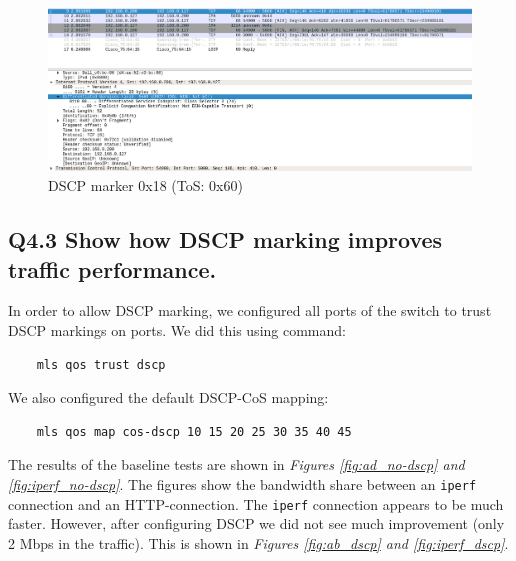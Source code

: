 \documentclass{article}
\begin{document}
\begin{figure}[H]
\centering
\includegraphics[width=17cm]{figures/dscp_marker.png}
\caption{DSCP marker 0x18 (ToS: 0x60)}
\centering
\label{fig:dscp_marker}
\end{figure}

\subsection{Q4.3 Show how DSCP marking improves traffic performance.}
In order to allow DSCP marking, we configured all ports of the switch to trust DSCP markings on ports. We did this using command:
\begin{verbatim}
    mls qos trust dscp
\end{verbatim}

We also configured the default DSCP-CoS mapping:
\begin{verbatim}
    mls qos map cos-dscp 10 15 20 25 30 35 40 45
\end{verbatim}

The results of the baseline tests are shown in \textit{Figures \ref{fig:ad_no-dscp} and \ref{fig:iperf_no-dscp}}. The figures show the bandwidth share between an \texttt{iperf} connection and an HTTP-connection. The \texttt{iperf} connection appears to be much faster. However, after configuring DSCP we did not see much improvement (only 2 Mbps in the  traffic). This is shown in \textit{Figures \ref{fig:ab_dscp} and \ref{fig:iperf_dscp}}.
\end{document}
